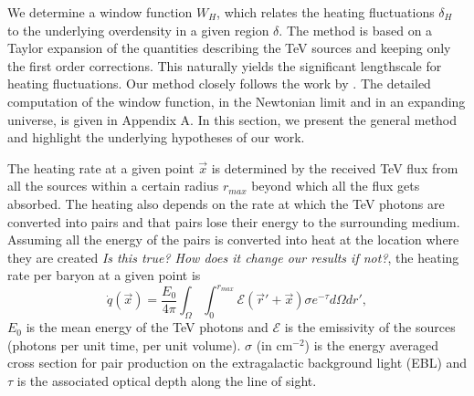 \documentclass[twocolumns]{emulateapj}
\begin{document}
We determine a window function $W_H$, which relates the heating fluctuations $\delta_H$ to the underlying overdensity in a given region $\delta$. The method is based on a Taylor expansion of the quantities describing the TeV sources and keeping only  the first order corrections. This naturally yields the significant lengthscale for heating fluctuations. Our method closely follows the work by   \citet{2007MNRAS.376.1680P,2005ApJ...626....1B}. The detailed computation of the window function, in the Newtonian limit and in an expanding universe, is given in Appendix A. In this section, we present the general method and highlight the underlying hypotheses of our work.

The heating rate at a given point $\vec{x}$ is determined by the received TeV flux from all the sources within a certain radius $r_{max}$ beyond which all the flux gets absorbed. The heating also depends on the rate at which the TeV photons are converted into pairs and that pairs lose their energy to the surrounding medium.  Assuming all the energy of the pairs is converted into heat at the location where they are created \textit{Is this true? How does it change our results if not?}, the heating rate per baryon at a given point is 
\begin{equation}
\label{eq:heating_rate}
  \dot{q}(\vec{x})= \frac{E_0}{4\pi}  \int_{\Omega}\int_0^{r_{max}}   \mathcal{E}(\vec{r}'+\vec{x})\sigma  e^{-\tau}d\Omega dr' ,
\end{equation}
 $E_0$ is the mean energy of the TeV photons and   $\mathcal{E}$ is the emissivity of the sources (photons per unit time, per unit volume). $\sigma$ (in cm$^{-2}$) is the energy averaged cross section for pair production on the extragalactic background light (EBL) and $\tau$ is the associated optical depth along the line of sight. 
\end{document}
